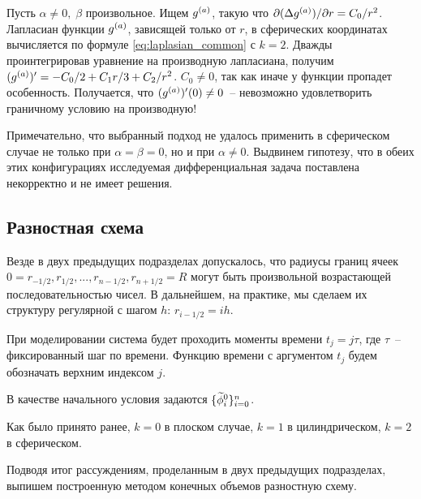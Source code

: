 Пусть $\alpha \neq 0, \; \beta$ произвольное. Ищем ${g^{(a)}}$, такую что $\partial (\Delta {g^{(a)}}) / \partial r = C_0 / r^2$. Лапласиан функции ${g^{(a)}}$, зависящей только от $r$, в сферических координатах вычисляется по формуле \eqref{eq:laplasian_common} с $k = 2$. Дважды проинтегрировав уравнение на производную лапласиана, получим $({g^{(a)}})' = -C_0 / 2 + C_1 r / 3 + C_2 / r^2$. $C_0 \neq 0$, так как иначе у функции пропадет особенность. Получается, что $(\ga)'(0) \hm \neq 0$~-- невозможно удовлетворить граничному условию на производную!

Примечательно, что выбранный подход не удалось применить в сферическом случае не только при $\alpha = \beta = 0$, но и при $\alpha \neq 0$. Выдвинем гипотезу, что в обеих этих конфигурациях исследуемая дифференциальная задача поставлена некорректно и не имеет решения.


\subsection{Разностная схема}

Везде в двух предыдущих подразделах допускалось, что радиусы границ ячеек $0 = r_{-1/2}, r_{1/2}, ..., r_{n - 1/2}, r_{n + 1/2} = R$ могут быть произвольной возрастающей последовательностью чисел. В дальнейшем, на практике, мы сделаем их структуру регулярной с шагом $h$: $r_{i - 1/2} = ih$.

При моделировании система будет проходить моменты времени $t_j = j \tau$, где $\tau$~-- фиксированный шаг по времени. Функцию времени с аргументом $t_j$ будем обозначать верхним индексом $j$.

В качестве начального условия задаются $\{ {\widetilde{\phi}}_i^0 \}_{i = 0}^n$.

Как было принято ранее, $k = 0$ в плоском случае, $k = 1$ в цилиндрическом, $k = 2$ в сферическом.

Подводя итог рассуждениям, проделанным в двух предыдущих подразделах, выпишем построенную методом конечных объемов разностную схему.

